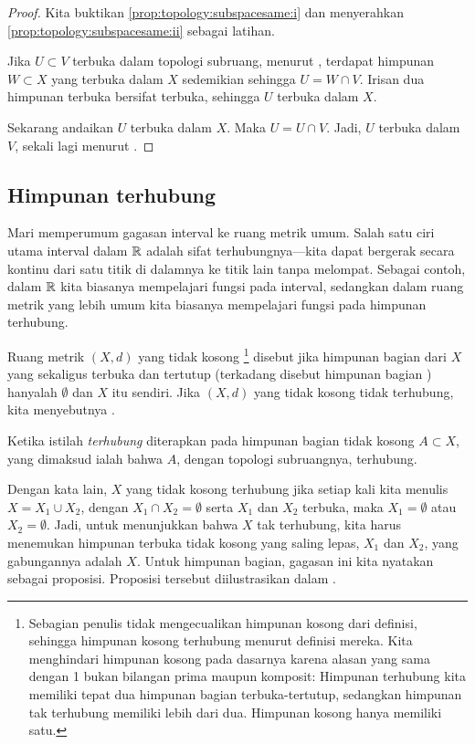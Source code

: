 \begin{proof}
Kita buktikan
\ref{prop:topology:subspacesame:i}
dan menyerahkan
\ref{prop:topology:subspacesame:ii} sebagai latihan.

Jika $U \subset V$ terbuka dalam topologi subruang, menurut
, terdapat himpunan $W \subset X$
yang terbuka dalam $X$ sedemikian sehingga $U = W \cap V$.  Irisan dua himpunan terbuka
bersifat terbuka, sehingga $U$ terbuka dalam $X$.

Sekarang andaikan $U$ terbuka dalam $X$.  Maka $U = U \cap V$.  Jadi,
$U$ terbuka dalam $V$, sekali lagi menurut .
\end{proof}

\subsection{Himpunan terhubung}

Mari memperumum gagasan interval ke ruang metrik umum.  Salah satu
ciri utama interval dalam ${\mathbb{R}}$ adalah sifat
terhubungnya---kita dapat bergerak secara kontinu dari satu titik di dalamnya ke
titik lain tanpa melompat.
Sebagai contoh, dalam ${\mathbb{R}}$ kita biasanya mempelajari fungsi pada interval,
sedangkan dalam ruang metrik yang lebih umum kita biasanya mempelajari fungsi pada himpunan terhubung.

\begin{defn}
Ruang metrik $(X,d)$ yang tidak kosong%
\footnote{Sebagian penulis tidak mengecualikan himpunan kosong dari definisi,
sehingga himpunan kosong terhubung menurut definisi mereka.
Kita menghindari himpunan kosong pada dasarnya karena alasan yang sama dengan
1 bukan bilangan prima maupun komposit:  Himpunan terhubung kita memiliki tepat
dua himpunan bagian terbuka-tertutup, sedangkan himpunan tak terhubung memiliki lebih dari dua.
Himpunan kosong hanya memiliki satu.}
disebut \emph{} jika himpunan bagian dari $X$ yang sekaligus
terbuka dan tertutup (terkadang disebut himpunan bagian
\emph{}) hanyalah $\emptyset$ dan $X$ itu sendiri.
Jika $(X,d)$ yang tidak kosong tidak terhubung, kita menyebutnya
\emph{}.

Ketika istilah \emph{terhubung} diterapkan pada himpunan bagian tidak kosong $A \subset X$,
yang dimaksud ialah bahwa $A$, dengan topologi subruangnya, terhubung.
\end{defn}

Dengan kata lain, $X$ yang tidak kosong terhubung jika setiap kali kita menulis
$X = X_1 \cup X_2$, dengan $X_1 \cap X_2 = \emptyset$ serta $X_1$ dan $X_2$
terbuka, maka $X_1 = \emptyset$ atau $X_2 = \emptyset$.
Jadi, untuk menunjukkan bahwa $X$ tak terhubung, kita harus menemukan himpunan terbuka
tidak kosong yang saling lepas, $X_1$ dan
$X_2$, yang gabungannya adalah $X$.
Untuk himpunan bagian, gagasan ini kita nyatakan sebagai proposisi.
Proposisi tersebut diilustrasikan dalam .


